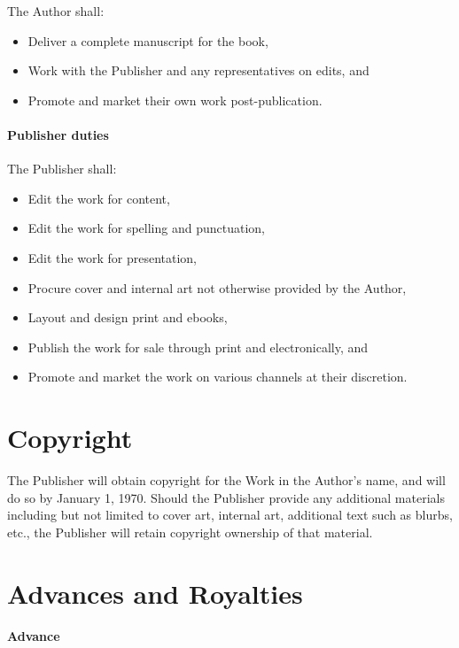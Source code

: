 \documentclass[12pt,letterpaper]{article}
\def\CopyrightDate{January 1, 1970}
\begin{document}
The Author shall:

\begin{itemize}
    \item Deliver a complete manuscript for the book,
    \item Work with the Publisher and any representatives on edits, and
    \item Promote and market their own work post-publication.
\end{itemize}

\paragraph{Publisher duties}

The Publisher shall:

\begin{itemize}
    \item Edit the work for content,
    \item Edit the work for spelling and punctuation,
    \item Edit the work for presentation,
    \item Procure cover and internal art not otherwise provided by the Author,
    \item Layout and design print and ebooks,
    \item Publish the work for sale through print and electronically, and
    \item Promote and market the work on various channels at their discretion.
\end{itemize}

\section{Copyright}

The Publisher will obtain copyright for the Work in the Author's name, and will do so by \CopyrightDate. Should the Publisher provide any additional materials including but not limited to cover art, internal art, additional text such as blurbs, etc., the Publisher will retain copyright ownership of that material.

\section{Advances and Royalties}

\paragraph{Advance}
\end{document}
